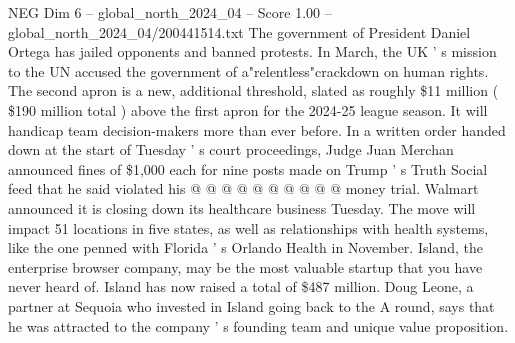 \begin{textsample}{NEG Dim 6 – global\_north\_2024\_04 – Score 1.00 – global\_north\_2024\_04/200441514.txt}
The government of President Daniel Ortega has jailed opponents and banned protests.
In March, the UK ' s mission to the UN accused the government of a"relentless"crackdown on human rights.
The second apron is a new, additional threshold, slated as roughly \$11 million ( \$190 million total ) above the first apron for the 2024-25 league season.
It will handicap team decision-makers more than ever before.
In a written order handed down at the start of Tuesday ' s court proceedings, Judge Juan Merchan announced fines of \$1,000 each for nine posts made on Trump ' s Truth Social feed that he said violated his @ @ @ @ @ @ @ @ @ @ money trial.
Walmart announced it is closing down its healthcare business Tuesday.
The move will impact 51 locations in five states, as well as relationships with health systems, like the one penned with Florida ' s Orlando Health in November.
Island, the enterprise browser company, may be the most valuable startup that you have never heard of.
Island has now raised a total of \$487 million.
Doug Leone, a partner at Sequoia who invested in Island going back to the A round, says that he was attracted to the company ' s founding team and unique value proposition.

\end{textsample}
